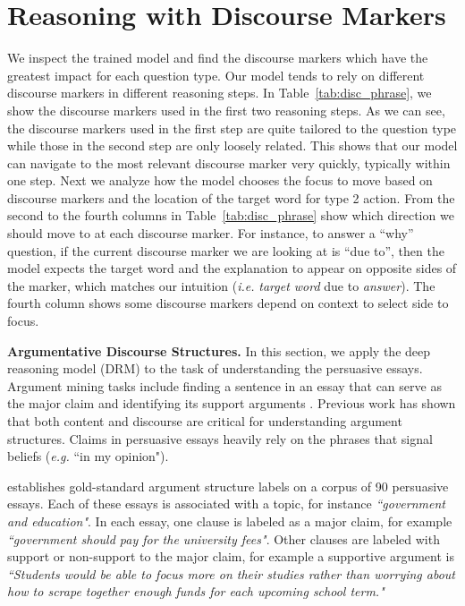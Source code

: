 


\section{Reasoning with Discourse Markers}
We inspect the trained model and find the discourse markers which have the greatest impact for each question type. Our model tends to rely on different discourse markers in different reasoning steps. In Table~\ref{tab:disc_phrase}, we show the discourse markers used in the first two reasoning steps. As we can see, the discourse markers used in the first step are quite tailored to the question type while those in the second step are only loosely related. This shows that our model can navigate to the most relevant discourse marker very quickly, typically within one step. Next we analyze how the model chooses the focus to move based on discourse markers and the location of the target word for type 2 action. From the second to the fourth columns in Table~\ref{tab:disc_phrase} show which direction we should move to at each discourse marker. For instance, to answer a ``why'' question, if the current discourse marker we are looking at is ``due to'', then the model expects the target word and the explanation to appear on opposite sides of the marker, which matches our intuition (\textit{i.e.} \textit{target word} due to \textit{answer}). The fourth column shows some discourse markers depend on context to select side to focus.




\textbf{Argumentative Discourse Structures.}
In this section, we apply the deep reasoning model (DRM) to the task of understanding the persuasive essays. %
Argument mining tasks include finding a sentence in an essay that can serve as the major claim and identifying its support arguments \cite{DBLP:conf/lrec/ReedPRM08}. Previous work \cite{DBLP:conf/emnlp/StabG14} has shown that both content and discourse are critical for understanding argument structures. Claims in persuasive essays heavily rely on the phrases that signal beliefs (\emph{e.g.} ``in my opinion"). 

\cite{DBLP:conf/coling/StabG14} establishes gold-standard argument structure labels on a corpus of 90 persuasive essays. Each of these essays is associated with a topic, for instance \textit{``government and education"}. 
In each essay, one clause is labeled as a major claim, for example \textit{``government should pay for the university fees"}. Other clauses are labeled with support or non-support to the major claim, for example a supportive argument is \textit{``Students would be able to focus more on their studies rather than worrying about how to scrape together enough funds for each upcoming school term."} 

